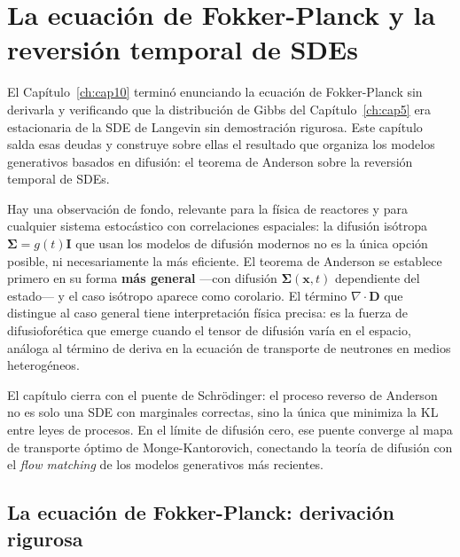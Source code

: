 \chapter{La ecuación de Fokker-Planck y la reversión temporal de SDEs}
\label{ch:cap11}

El Capítulo~\ref{ch:cap10} terminó enunciando la ecuación de Fokker-Planck sin derivarla y
verificando que la distribución de Gibbs del Capítulo~\ref{ch:cap5} era estacionaria de la
SDE de Langevin sin demostración rigurosa. Este capítulo salda esas deudas y
construye sobre ellas el resultado que organiza los modelos generativos basados
en difusión: el teorema de Anderson sobre la reversión temporal de SDEs.

Hay una observación de fondo, relevante para la física de reactores y para
cualquier sistema estocástico con correlaciones espaciales: la difusión isótropa
$\bm{\Sigma} = g(t)\bm{I}$ que usan los modelos de difusión modernos no es la
única opción posible, ni necesariamente la más eficiente. El teorema de Anderson
se establece primero en su forma \textbf{más general} —con difusión $\bm{\Sigma}(\bm{x},t)$
dependiente del estado— y el caso isótropo aparece como corolario. El término
$\nabla\cdot\bm{D}$ que distingue al caso general tiene interpretación física
precisa: es la fuerza de difusio\-fo\-ré\-ti\-ca que emerge cuando el tensor de
difusión varía en el espacio, análoga al término de deriva en la ecuación de
transporte de neutrones en medios heterogéneos.

El capítulo cierra con el puente de Schrödinger: el proceso reverso de Anderson
no es solo una SDE con marginales correctas, sino la única que minimiza la KL
entre leyes de procesos. En el límite de difusión cero, ese puente converge
al mapa de transporte óptimo de Monge-Kantorovich, conectando la teoría de
difusión con el \textit{flow matching} de los modelos generativos más recientes.

\section{La ecuación de Fokker-Planck: derivación rigurosa}
\label{sec:fp}

